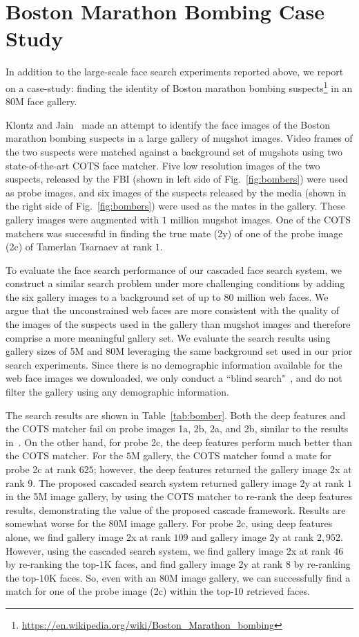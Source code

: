 \documentclass[10pt,journal,compsoc]{IEEEtran}
\begin{document}
\section{Boston Marathon Bombing Case Study}
In addition to the large-scale face search experiments reported above, we report on a case-study: finding the identity of Boston marathon bombing suspects\footnote{\url{https://en.wikipedia.org/wiki/Boston_Marathon_bombing}} in an $80$M face gallery.

Klontz and Jain~\cite{faceretrieval:bomber} made an attempt to identify the face images of the Boston marathon bombing suspects in a large gallery of mugshot images. Video frames of the two suspects were matched against a background set of mugshots using two state-of-the-art COTS face matcher. Five low resolution images of the two suspects, released by the FBI (shown in left side of Fig.~\ref{fig:bombers}) were used as probe images, and six images of the suspects released by the media (shown in the right side of Fig.~\ref{fig:bombers}) were used as the mates in the gallery. These gallery images were augmented with $1$ million mugshot images. One of the COTS matchers was successful in finding the true mate (2y) of one of  the probe image (2c) of Tamerlan Tsarnaev at rank $1$.

To evaluate the face search performance of our cascaded face search system, we construct a similar search problem under more challenging conditions by adding the six gallery images to a background set of up to $80$ million web faces. We argue that the unconstrained web faces are more consistent with the quality of the images of the suspects used in the gallery than mugshot images and therefore comprise a more meaningful gallery set. We evaluate the search results using gallery sizes of 5M and $80$M leveraging the same background set used in our prior search experiments. Since there is no demographic information available for the web face images we downloaded, we only conduct a ``blind search"~\cite{faceretrieval:bomber}, and do not filter the gallery using any demographic information.

The search results are shown in Table~\ref{tab:bomber}. Both the deep features and the COTS matcher fail on probe images 1a, 2b, 2a, and 2b, similar to the results in~\cite{faceretrieval:bomber}. On the other hand, for probe 2c, the deep features perform much better than the COTS matcher. For the $5$M gallery, the COTS matcher found a mate for probe 2c at rank $625$; however, the deep features returned the gallery image 2x at rank $9$. The proposed cascaded search system returned gallery image 2y at rank $1$ in the 5M image gallery, by using the COTS matcher to re-rank the deep features results, demonstrating the value of the proposed cascade framework. Results are somewhat worse for the $80$M image gallery. For probe 2c, using deep features alone, we find gallery image 2x at rank $109$ and gallery image 2y at rank $2,952$. However, using the cascaded search system, we find gallery image 2x at rank $46$ by re-ranking the top-$1$K faces, and find gallery image 2y at rank $8$ by re-ranking the top-$10$K faces. So, even with an $80$M image gallery, we can successfully find a match for one of the probe image (2c) within the top-10 retrieved faces.
\end{document}
